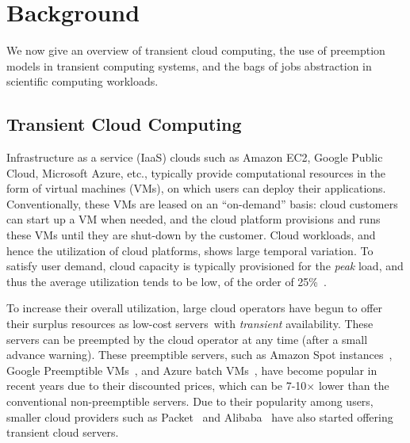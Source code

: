\vspace*{\subsecspace}
\section{Background}

We now give an overview of transient cloud computing, the use of preemption models in transient computing systems, and the bags of jobs abstraction in scientific computing workloads. 



\vspace*{\subsecspace}
\subsection{Transient Cloud Computing}

Infrastructure as a service (IaaS) clouds such as Amazon EC2, Google Public Cloud, Microsoft Azure, etc., typically provide computational resources in the form of virtual machines (VMs), on which users can deploy their applications.
Conventionally, these VMs are leased on an ``on-demand'' basis: cloud customers can start up a VM when needed, and the cloud platform provisions and runs these VMs until they are shut-down by the customer. 
Cloud workloads, and hence the utilization of cloud platforms, shows large temporal variation. 
To satisfy user demand, cloud capacity is typically provisioned for the \emph{peak} load, and thus the average utilization tends to be low, of the order of 25\%~\cite{borg,resource-central-sosp17}. 


To increase their overall utilization, large cloud operators have begun to offer their surplus resources as low-cost servers\footnotemark \ with \emph{transient} availability. These servers can be preempted by the cloud operator at any time (after a small advance warning). 
These preemptible servers, such as Amazon Spot instances~\cite{ec2-spot}, Google Preemptible VMs~\cite{preemptible-documentation}, and Azure batch VMs~\cite{azure-batch}, have become popular in recent years due to their discounted prices, which can be 7-10$\times$ lower than the conventional non-preemptible servers.
%
Due to their popularity among users, smaller cloud providers such as Packet~\cite{packet-spot} and Alibaba~\cite{alibaba-spot} have also started offering transient cloud servers. 

